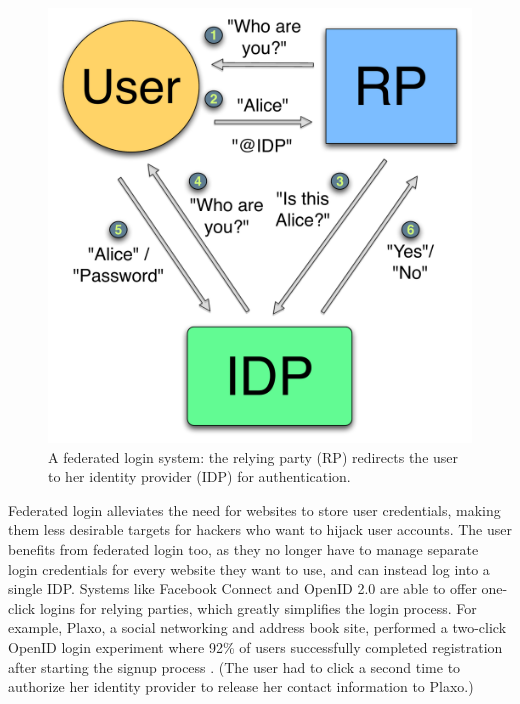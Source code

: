 \documentclass{llncs}
\begin{document}
\begin{figure}
  \centering
  \includegraphics[scale=0.5]{figs/fig-fedlog-color.pdf}
  \caption{A federated login system: the relying party (RP) redirects
  the user to her identity provider (IDP) for authentication.}
  \label{fig:fedlog}
\end{figure}


Federated login alleviates the need for websites to store user credentials,
making them less desirable targets for hackers who want to hijack user accounts.
The user benefits from federated login too, as they no longer have to manage
separate login credentials for every website they want to use, and can instead
log into a single IDP. Systems like Facebook Connect and OpenID 2.0 are able to
offer one-click logins for relying parties, which greatly simplifies the login
process. For example, Plaxo, a social networking and address book site,
performed a two-click OpenID login experiment where 92\% of users successfully
completed registration after starting the signup process \cite{Ki09}. (The user
had to click a second time to authorize her identity provider to release her
contact information to Plaxo.)
\end{document}
